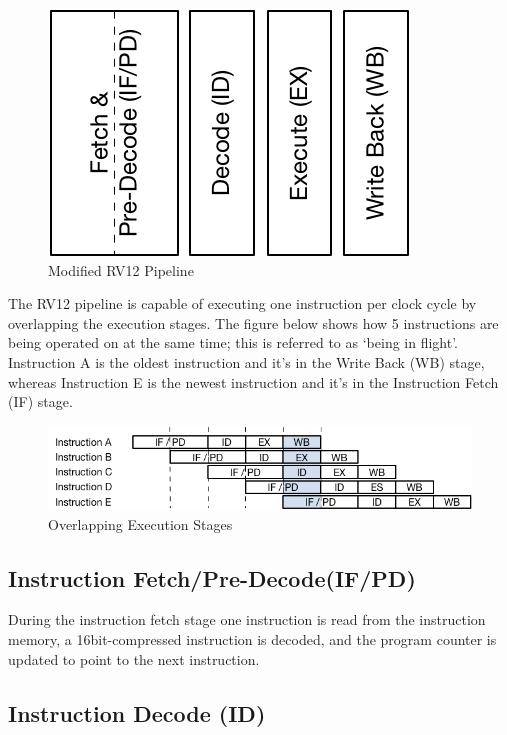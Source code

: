 \begin{figure}[hbt]
  \includegraphics{assets/img/Pipeline-RV12}
  \caption{Modified RV12 Pipeline}
\end{figure}

The RV12 pipeline is capable of executing one instruction per clock cycle by overlapping the execution stages. 
The figure below shows how 5 instructions are being operated on at the same time; this is referred to as `being in flight'. 
Instruction A is the oldest instruction and it's in the Write Back (WB) stage, whereas Instruction E is the
newest instruction and it's in the Instruction Fetch (IF) stage.

\begin{figure}[hbt]
  \includegraphics{assets/img/Pipeline-Overlap}
  \caption{Overlapping Execution Stages}
\end{figure}

\subsection{Instruction Fetch/Pre-Decode(IF/PD)} \label{instruction-fetchpre-decode-ifpd}

During the instruction fetch stage one instruction is read from the instruction memory, a 16bit-compressed instruction is decoded, and the program counter is updated to point to the next instruction.

\subsection{Instruction Decode (ID)} \label{instruction-decode-id}

